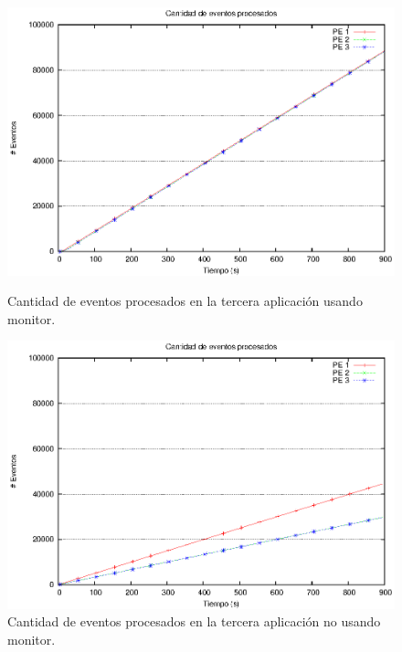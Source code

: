 \begin{figure}[!hptb]
\centering

\begin{minipage}[c]{0.45\textwidth}
\centering
    \includegraphics[width=\textwidth]{images/exp/app3/cm/logical/eventCount.eps}
    \caption{Cantidad de eventos procesados en la tercera aplicación usando monitor.}
    \label{fig:app3-eventCount-cm}
\end{minipage} \hspace*{1cm}
\begin{minipage}[c]{0.45\textwidth}
\centering
    \includegraphics[width=\textwidth]{images/exp/app3/sm/logical/eventCount.eps}
    \caption{Cantidad de eventos procesados en la tercera aplicación no usando monitor.}
    \label{fig:app3-eventCount-sm}
\end{minipage}

\end{figure}

